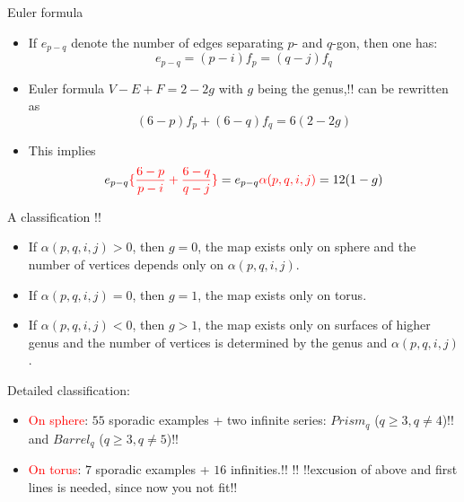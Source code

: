 \documentclass[%
pdf,
colorBG,
slideColor,
]{prosper}
\begin{document}
\begin{slide}{Euler formula}
\begin{itemize}
\item If $e_{p-q}$ denote the number of edges 
separating $p$- and $q$-gon, then one has:
\begin{equation*}
e_{p-q}=(p-i)f_p=(q-j)f_q
\end{equation*}
\item Euler formula $V-E+F=2-2g$ with $g$ being the genus,!! 
can be rewritten as
\begin{equation*}
(6-p)f_p+(6-q)f_q=6(2-2g)
\end{equation*}
\item This implies
\begin{equation*}
e_{p-q}\textcolor{red}{\{\frac{6-p}{p-i}+\frac{6-q}{q-j}\} }=e_{p-q}\textcolor{red}{\alpha(p,q,i,j)}=12(1-g)
\end{equation*}
\end{itemize}


\end{slide}








\begin{slide}{A classification}
!!%
\begin{itemize}
\item If $\alpha(p,q,i,j)>0$, then $g=0$, the map exists only on sphere and the number of vertices depends only on $\alpha(p,q,i,j)$.
\item If $\alpha(p,q,i,j)=0$, then $g=1$, the map exists only on torus.
\item If $\alpha(p,q,i,j)<0$, then $g>1$, the map exists only on surfaces of higher genus and the number of vertices is determined by the genus and $\alpha(p,q,i,j)$.
\end{itemize}
Detailed classification:
\begin{itemize}
\item \textcolor{red}{On sphere}: $55$ sporadic examples + two infinite 
series: $Prism_q$ ($q \ge 3, q \neq 4$)!! and $Barrel_q$ ($q \ge 3, q 
\neq 5$)!!
\item \textcolor{red}{On torus}: $7$ sporadic examples + $16$ 
infinities.!! 
!!%
!!excusion of above and first lines is needed, since now you not fit!!
\end{itemize}


\end{slide}
\end{document}

